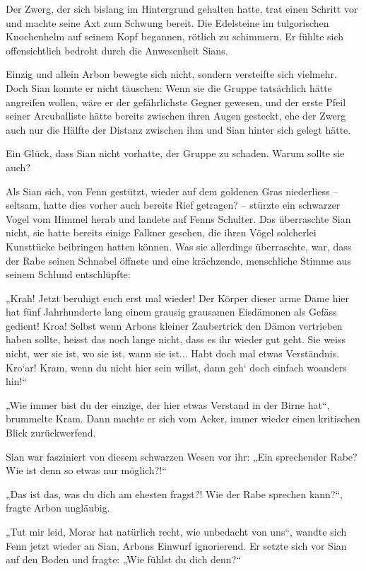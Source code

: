 \documentclass[10pt, a4paper, oneside]{book}
\begin{document}
Der Zwerg, der sich bislang im Hintergrund gehalten hatte, trat einen Schritt vor und machte seine Axt zum Schwung bereit. Die Edelsteine im tulgorischen Knochenhelm auf seinem Kopf begannen, rötlich zu schimmern. Er fühlte sich offensichtlich bedroht durch die Anwesenheit Sians.

Einzig und allein Arbon bewegte sich nicht, sondern versteifte sich vielmehr. Doch Sian konnte er nicht täuschen: Wenn sie die Gruppe tatsächlich hätte angreifen wollen, wäre er der gefährlichste Gegner gewesen, und der erste Pfeil seiner Arcuballiste hätte bereits zwischen ihren Augen gesteckt, ehe der Zwerg auch nur die Hälfte der Distanz zwischen ihm und Sian hinter sich gelegt hätte.

Ein Glück, dass Sian nicht vorhatte, der Gruppe zu schaden. Warum sollte sie auch?

Als Sian sich, von Fenn gestützt, wieder auf dem goldenen Gras niederliess – seltsam, hatte dies vorher auch bereits Rief getragen? – stürzte ein schwarzer Vogel vom Himmel herab und landete auf Fenns Schulter. Das überraschte Sian nicht, sie hatte bereits einige Falkner gesehen, die ihren Vögel solcherlei Kunsttücke beibringen hatten können. Was sie allerdings überraschte, war, dass der Rabe seinen Schnabel öffnete und eine krächzende, menschliche Stimme aus seinem Schlund entschlüpfte:

„Krah! Jetzt beruhigt euch erst mal wieder! Der Körper dieser arme Dame hier hat fünf Jahrhunderte lang einem grausig grausamen Eisdämonen als Gefäss gedient! Kroa! Selbst wenn Arbons kleiner Zaubertrick den Dämon vertrieben haben sollte, heisst das noch lange nicht, dass es ihr wieder gut geht. Sie weiss nicht, wer sie ist, wo sie ist, wann sie ist... Habt doch mal etwas Verständnis. Kro‘ar! Kram, wenn du nicht hier sein willst, dann geh‘ doch einfach woanders hin!“

„Wie immer bist du der einzige, der hier etwas Verstand in der Birne hat“, brummelte Kram. Dann machte er sich vom Acker, immer wieder einen kritischen Blick zurückwerfend.

Sian war fasziniert von diesem schwarzen Wesen vor ihr: „Ein sprechender Rabe? Wie ist denn so etwas nur möglich?!“

„Das ist das, was du dich am ehesten fragst?! Wie der Rabe sprechen kann?“, fragte Arbon ungläubig.

„Tut mir leid, Morar hat natürlich recht, wie unbedacht von uns“, wandte sich Fenn jetzt wieder an Sian, Arbons Einwurf ignorierend. Er setzte sich vor Sian auf den Boden und fragte: „Wie fühlst du dich denn?“
\end{document}
